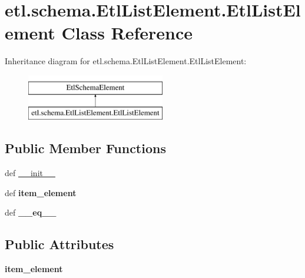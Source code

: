 \hypertarget{classetl_1_1schema_1_1EtlListElement_1_1EtlListElement}{\section{etl.\-schema.\-Etl\-List\-Element.\-Etl\-List\-Element Class Reference}
\label{classetl_1_1schema_1_1EtlListElement_1_1EtlListElement}
}
Inheritance diagram for etl.\-schema.\-Etl\-List\-Element.\-Etl\-List\-Element\-:\begin{figure}[H]
\begin{center}
\leavevmode
\includegraphics[height=2.000000cm]{classetl_1_1schema_1_1EtlListElement_1_1EtlListElement}
\end{center}
\end{figure}
\subsection*{Public Member Functions}
\begin{DoxyCompactItemize}
\item 
def \hyperlink{classetl_1_1schema_1_1EtlListElement_1_1EtlListElement_a3774caef17d71b25cffaef6da71a26ee}{\-\_\-\-\_\-init\-\_\-\-\_\-}
\item 
\hypertarget{classetl_1_1schema_1_1EtlListElement_1_1EtlListElement_a90c83ba5ed2b8367dcd5f81b9f047a6f}{def {\bfseries item\-\_\-element}}\label{classetl_1_1schema_1_1EtlListElement_1_1EtlListElement_a90c83ba5ed2b8367dcd5f81b9f047a6f}

\item 
\hypertarget{classetl_1_1schema_1_1EtlListElement_1_1EtlListElement_a528d1bbe3f09aa7c509c7f10d4c598a7}{def {\bfseries \-\_\-\-\_\-eq\-\_\-\-\_\-}}\label{classetl_1_1schema_1_1EtlListElement_1_1EtlListElement_a528d1bbe3f09aa7c509c7f10d4c598a7}

\end{DoxyCompactItemize}
\subsection*{Public Attributes}
\begin{DoxyCompactItemize}
\item 
\hypertarget{classetl_1_1schema_1_1EtlListElement_1_1EtlListElement_a0b3e124ce4ecb1bb3532af211ba7b9fe}{{\bfseries item\-\_\-element}}\label{classetl_1_1schema_1_1EtlListElement_1_1EtlListElement_a0b3e124ce4ecb1bb3532af211ba7b9fe}

\end{DoxyCompactItemize}


